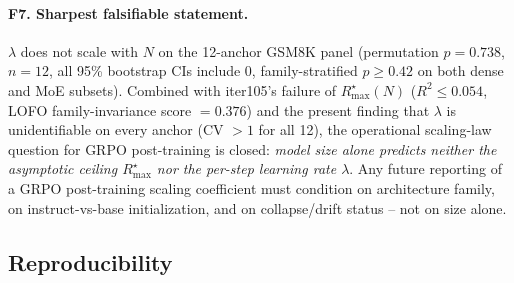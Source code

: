\paragraph{F7. Sharpest falsifiable statement.}
$\lambda$ does not scale with $N$ on the 12-anchor GSM8K panel (permutation $p = 0.738$, $n = 12$, all 95\% bootstrap CIs include 0, family-stratified $p \ge 0.42$ on both dense and MoE subsets).  Combined with iter105's failure of $R_\mathrm{max}^\star(N)$ ($R^2 \le 0.054$, LOFO family-invariance score $= 0.376$) and the present finding that $\lambda$ is unidentifiable on every anchor (CV $> 1$ for all 12), the operational scaling-law question for GRPO post-training is closed: \emph{model size alone predicts neither the asymptotic ceiling $R_\mathrm{max}^\star$ nor the per-step learning rate $\lambda$}.  Any future reporting of a GRPO post-training scaling coefficient must condition on architecture family, on instruct-vs-base initialization, and on collapse/drift status -- not on size alone.

\subsection*{Reproducibility}

